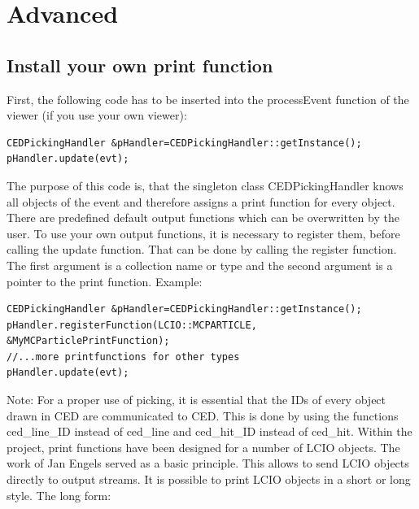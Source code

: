 \documentclass[a4paper,10pt]{article}
\begin{document}

\section{Advanced}
\subsection{Install your own print function}\label{own_picking}
First, the following code has to be inserted into the processEvent function of the viewer (if you use your own viewer):
\begin{verbatim}
CEDPickingHandler &pHandler=CEDPickingHandler::getInstance();
pHandler.update(evt);
\end{verbatim}

The purpose of this code is, that the singleton class CEDPickingHandler knows all objects of the event and therefore assigns a print function for every object. There are predefined default output functions which can be overwritten by the user. To use your own output functions, it is necessary to register them, before calling the update function. That can be done by
calling the register function. The first argument is a collection name or type and the second argument is a pointer to the print function.
Example:
\begin{verbatim}
CEDPickingHandler &pHandler=CEDPickingHandler::getInstance();
pHandler.registerFunction(LCIO::MCPARTICLE, &MyMCParticlePrintFunction);
//...more printfunctions for other types
pHandler.update(evt);
\end{verbatim}

Note: For a proper use of picking, it is essential that the IDs of every object drawn in CED are communicated to CED. This is done by using the functions ced\_line\_ID instead of ced\_line and ced\_hit\_ID instead of ced\_hit. 
\newline
Within the project, print functions have been designed for a number of LCIO objects. The work of Jan Engels served as a basic principle. This allows to send LCIO objects directly to output streams. It is possible to print LCIO objects in a short or long style. The long form:
\end{document}
